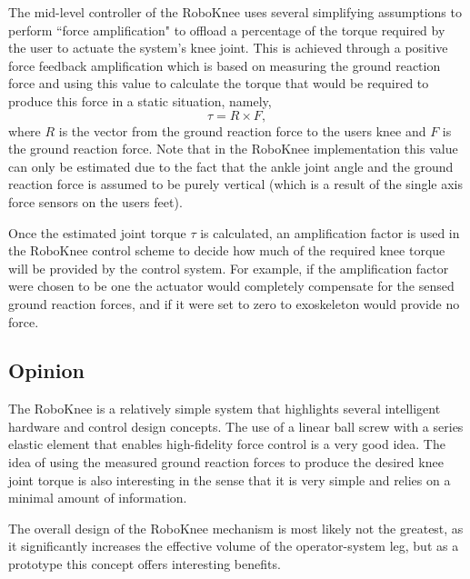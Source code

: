  The mid-level controller of the RoboKnee uses several simplifying assumptions to perform ``force amplification" to offload a percentage of the torque required by the user to actuate the system's knee joint.  This is achieved through a positive force feedback amplification which is based on measuring the ground reaction force and using this value to calculate the torque that would be required to produce this force in a static situation, namely, \[ \tau = R \times F,\] where $R$ is the vector from the ground reaction force to the users knee and $F$ is the ground reaction force.  Note that in the RoboKnee implementation this value can only be estimated due to the fact that the ankle joint angle and the ground reaction force is assumed to be purely vertical (which is a result of the single axis force sensors on the users feet).
   
   
 Once the estimated joint torque $\tau$ is calculated, an amplification factor is used in the RoboKnee control scheme to decide how much of the required knee torque will be provided by the control system.  For example, if the amplification factor were chosen to be one the actuator would completely compensate for the sensed ground reaction forces, and if it were set to zero to exoskeleton would provide no force.
  
 
 \subsection{Opinion} 
 
 The RoboKnee is a relatively simple system that highlights several intelligent hardware and control design concepts.  The use of a linear ball screw with a series elastic element that enables high-fidelity force control is a very good idea. The idea of using the measured ground reaction forces to produce the desired knee joint torque is also interesting in the sense that it is very simple and relies on a minimal amount of information.
 
 The overall design of the RoboKnee mechanism is most likely not the greatest, as it significantly increases the effective volume of the operator-system leg, but as a prototype this concept offers interesting benefits.
 
 
 
 
 